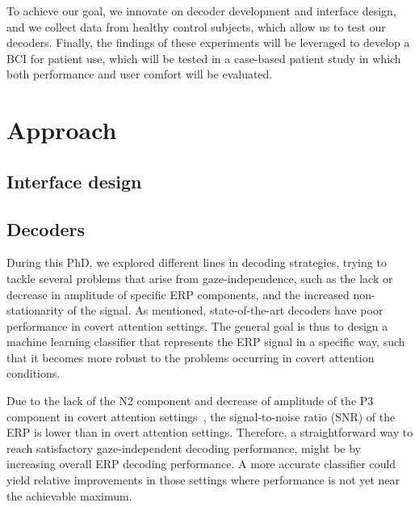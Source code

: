To achieve our goal, we innovate on decoder development and interface design,
and we collect data from healthy control subjects, which allow us to test our decoders.
Finally, the findings of these experiments will be leveraged to develop a BCI
for patient use, which will be tested in a case-based patient study in which
both performance and user comfort will be evaluated.



\section{Approach}

\subsection{Interface design}



\subsection{Decoders}

During this PhD, we explored different lines in decoding strategies,
trying to tackle several problems that arise from gaze-independence, such as
the lack or decrease in amplitude of specific ERP components, and the increased
non-stationarity of the signal.
As mentioned, state-of-the-art decoders have poor performance in covert attention
settings.
The general goal is thus to design a machine learning classifier that represents
the ERP signal in a specific way, such that it becomes more robust to the problems
occurring in covert attention conditions.


Due to the lack of the N2 component and decrease of amplitude of the
P3 component in covert attention
settings~\cite{Treder2010}, the signal-to-noise ratio (SNR) of
the ERP is lower than in overt attention settings.
Therefore, a straightforward way to reach satisfactory
gaze-independent decoding performance, might be by increasing overall ERP
decoding performance. A more accurate classifier could yield relative
improvements in those settings where performance is not yet near the achievable
maximum.

